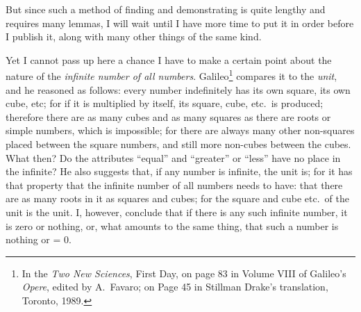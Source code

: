 \documentclass[twoside,openright]{article}
\begin{document}
But since such a method of finding and demonstrating is quite lengthy and
requires many lemmas, I will wait until I have more time to put it in order
before I publish it, along with many other things of the same
kind.


Yet I cannot pass up here a chance I have to make a certain point about the
nature of the {\em infinite number of all numbers}.  Galileo\footnote{In the {\em Two New Sciences}, First Day, on page 83 in Volume VIII of Galileo's {\em Opere}, edited by A.\ Favaro; on Page 45 in Stillman Drake's translation, Toronto, 1989.} compares it to the {\em unit}, and he reasoned as follows:
every number indefinitely has its own square, its own cube, etc; for if it is
multiplied by itself, its square, cube, etc.\ is produced; therefore there are
as many cubes and as many squares as there are roots or simple numbers, which
is impossible; for there are always many other non-squares placed between the
square numbers, and still more non-cubes between the cubes.  What then?  Do
the attributes ``equal'' and ``greater'' or ``less'' have no place in the
infinite?  He also suggests that, if any number is infinite, the unit is; for
it has that property that the infinite number of all numbers needs to have:
that there are as many roots in it as squares and cubes; for the square and
cube etc.\ of the unit is the unit.  I, however, conclude that if there is any
such infinite number, it is zero or nothing, or, what amounts to the same
thing, that such a number is nothing or = 0.
\end{document}
